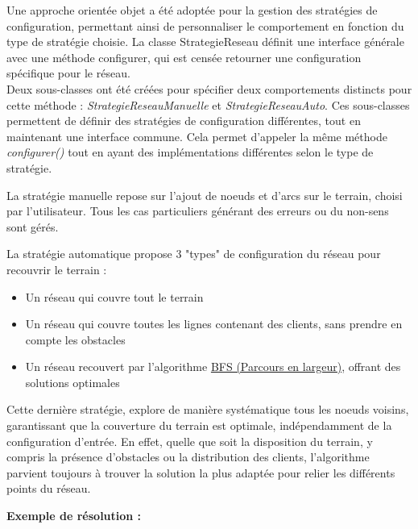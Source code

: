 Une approche orientée objet a été adoptée pour la gestion des stratégies de configuration, permettant ainsi de personnaliser le comportement en fonction du type de stratégie choisie. La classe StrategieReseau définit une interface générale avec une méthode configurer, qui est censée retourner une configuration spécifique pour le réseau.
\\
Deux sous-classes ont été créées pour spécifier deux comportements distincts pour cette méthode : \textit{StrategieReseauManuelle} et \textit{StrategieReseauAuto}. Ces sous-classes permettent de définir des stratégies de configuration différentes, tout en maintenant une interface commune. Cela permet d’appeler la même méthode \textit{configurer()} tout en ayant des implémentations différentes selon le type de stratégie.
\vspace{0.2cm}

La stratégie manuelle repose sur l'ajout de noeuds et d'arcs sur le terrain, choisi par l'utilisateur. Tous les cas particuliers générant des erreurs ou du non-sens sont gérés.

La stratégie automatique propose 3 "types" de configuration du réseau pour recouvrir le terrain :

\begin{itemize}
\item Un réseau qui couvre tout le terrain
\item Un réseau qui couvre toutes les lignes contenant des clients, sans prendre en compte les obstacles
\item Un réseau recouvert par l'algorithme \href{https://fr.wikipedia.org/wiki/Algorithme_de_parcours_en_largeur}{BFS (Parcours en largeur)}, offrant des solutions optimales
\end{itemize}

Cette dernière stratégie, explore de manière systématique tous les noeuds voisins, garantissant que la couverture du terrain est optimale, indépendamment de la configuration d'entrée. En effet, quelle que soit la disposition du terrain, y compris la présence d'obstacles ou la distribution des clients, l'algorithme parvient toujours à trouver la solution la plus adaptée pour relier les différents points du réseau.

\textbf{Exemple de résolution :}